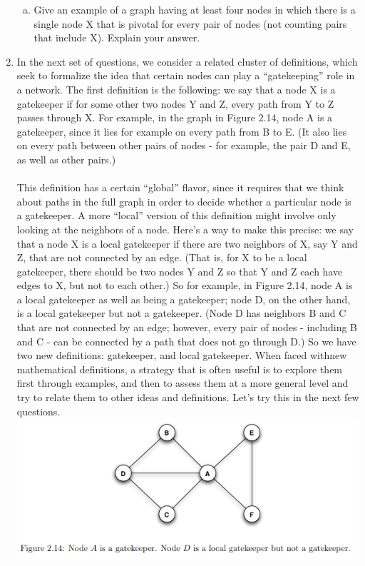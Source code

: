 \documentclass[11pt]{article}
\begin{document}
\begin{enumerate}
{\begin{enumerate}[(a)]
\begin{center}
\end{center}
\item  Give an example of a graph having at least four nodes in which there is a single
node X that is pivotal for every pair of nodes (not counting pairs that include X). Explain your answer.
\end{enumerate}
}
\item In the next set of questions, we consider a related cluster of definitions, which seek to formalize the idea that certain nodes can play a “gatekeeping” role in a network. The first definition is the following: we say that a node X is a gatekeeper if for some other two nodes Y and Z, every path from Y to Z passes through X. For example, in the graph in Figure 2.14, node A is a gatekeeper, since it lies for example on every path from B to E. (It also lies on every path between other pairs of nodes - for example, the pair D and E, as well as other pairs.)\\\\
\quad This definition has a certain “global” flavor, since it requires that we think about paths in the full graph in order to decide whether a particular node is a gatekeeper. A more “local” version of this definition might involve only looking at the neighbors of a node. Here’s a way to make this precise: we say that a node X is a local gatekeeper if there are two neighbors of X, say Y and Z, that are not connected by an edge. (That is, for X to be a local gatekeeper, there should be two nodes Y and Z so that Y and Z each have edges to X, but not to each other.) So for example, in Figure 2.14, node A is a local gatekeeper as well as being a gatekeeper; node D, on the other hand, is a local gatekeeper but not a gatekeeper. (Node D has neighbors B and C that are not connected by an edge; however, every pair of nodes - including B and C - can be connected by a path that does not go through D.) So we have two new definitions: gatekeeper, and local gatekeeper. When faced withnew mathematical definitions, a strategy that is often useful is to explore them first through examples, and then to assess them at a more general level and try to relate them to other ideas and definitions. Let’s try this in the next few questions.\\
\includegraphics[scale=2.4]{Figure_12_4}

\end{enumerate}
\end{document}
